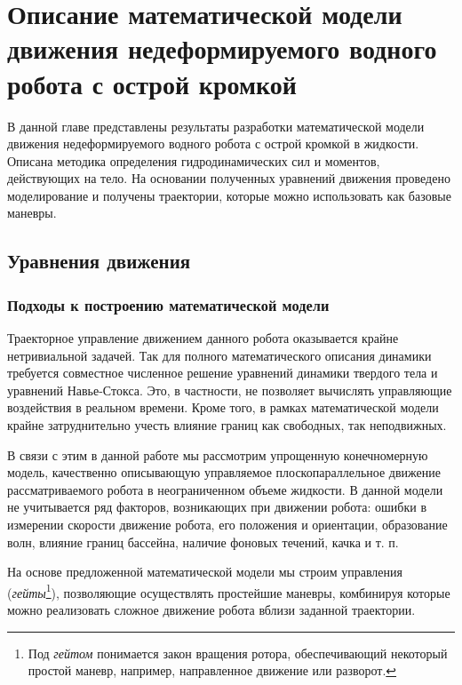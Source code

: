 \chapter{Описание математической модели движения недеформируемого водного робота с острой кромкой}\label{ch:ch6}

В данной главе представлены результаты разработки математической модели движения недеформируемого водного робота с острой кромкой в жидкости. Описана методика определения гидродинамических сил и моментов, действующих на тело. На основании полученных уравнений движения проведено моделирование и получены траектории, которые можно использовать как  базовые маневры.

\section{Уравнения движения}

\subsection{Подходы к построению математической модели}



Траекторное управление движением данного робота оказывается крайне нетривиальной задачей. Так для полного математического описания динамики требуется совместное численное решение уравнений динамики твердого тела и уравнений Навье-Стокса. Это, в частности, не позволяет вычислять управляющие воздействия в реальном времени. Кроме того, в рамках математической модели крайне затруднительно учесть влияние границ как свободных, так неподвижных.

В связи с этим в данной работе мы рассмотрим упрощенную конечномерную модель, качественно описывающую управляемое плоскопараллельное движение рассматриваемого робота в неограниченном объеме жидкости. В данной модели не учитывается ряд факторов, возникающих при движении робота: ошибки в измерении скорости движение робота, его положения и ориентации, образование волн, влияние границ бассейна, наличие фоновых течений, качка и т. п.

На основе предложенной математической модели мы строим управления (\textit{гейты}\footnote{Под \textit{гейтом}  понимается закон вращения ротора, обеспечивающий некоторый простой маневр, например, направленное движение или разворот.}), позволяющие осуществлять простейшие маневры, комбинируя которые можно реализовать сложное движение робота вблизи заданной траектории. %


